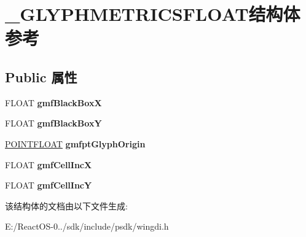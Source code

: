 \hypertarget{struct___g_l_y_p_h_m_e_t_r_i_c_s_f_l_o_a_t}{}\section{\+\_\+\+G\+L\+Y\+P\+H\+M\+E\+T\+R\+I\+C\+S\+F\+L\+O\+A\+T结构体 参考}
\label{struct___g_l_y_p_h_m_e_t_r_i_c_s_f_l_o_a_t}
\subsection*{Public 属性}
\begin{DoxyCompactItemize}
\item 
\mbox{\label{struct___g_l_y_p_h_m_e_t_r_i_c_s_f_l_o_a_t_a8a9b281eba55f1433a5483a6ff34160a}} 
F\+L\+O\+AT {\bfseries gmf\+Black\+BoxX}
\item 
\mbox{\label{struct___g_l_y_p_h_m_e_t_r_i_c_s_f_l_o_a_t_acb7dddf704c7ec285726fd44c503a4c8}} 
F\+L\+O\+AT {\bfseries gmf\+Black\+BoxY}
\item 
\mbox{\label{struct___g_l_y_p_h_m_e_t_r_i_c_s_f_l_o_a_t_a8d3e7d73a7831db7b5471d89431ab202}} 
\hyperlink{struct___p_o_i_n_t_f_l_o_a_t}{P\+O\+I\+N\+T\+F\+L\+O\+AT} {\bfseries gmfpt\+Glyph\+Origin}
\item 
\mbox{\label{struct___g_l_y_p_h_m_e_t_r_i_c_s_f_l_o_a_t_a018fe2fa6fde3295f7575ee735b606a0}} 
F\+L\+O\+AT {\bfseries gmf\+Cell\+IncX}
\item 
\mbox{\label{struct___g_l_y_p_h_m_e_t_r_i_c_s_f_l_o_a_t_a2b2bef0df637b472790e2d746476d0a2}} 
F\+L\+O\+AT {\bfseries gmf\+Cell\+IncY}
\end{DoxyCompactItemize}


该结构体的文档由以下文件生成\+:\begin{DoxyCompactItemize}
\item 
E\+:/\+React\+O\+S-\/0../sdk/include/psdk/wingdi.\+h\end{DoxyCompactItemize}
